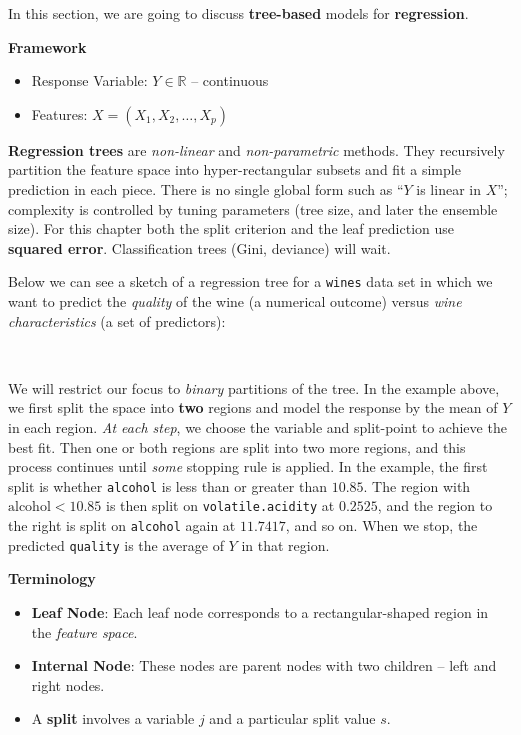 \documentclass[
]{book}
\providecommand{\tightlist}{%
  \setlength{\itemsep}{0pt}\setlength{\parskip}{0pt}}
\begin{document}
In this section, we are going to discuss \textbf{tree-based} models for \textbf{regression}.

\textbf{Framework}

\begin{itemize}
\tightlist
\item
  Response Variable: \(Y\in \mathbb{R}\) -- continuous ~
\item
  Features: \(X = (X_1, X_2, \ldots, X_p)\)~
\end{itemize}

\textbf{Regression trees} are \emph{non-linear} and \emph{non-parametric} methods. They recursively partition the feature space into hyper-rectangular subsets and fit a simple prediction in each piece. There is no single global form such as ``\(Y\) is linear in \(X\)''; complexity is controlled by tuning parameters (tree size, and later the ensemble size). For this chapter both the split criterion and the leaf prediction use \textbf{squared error}. Classification trees (Gini, deviance) will wait.

Below we can see a sketch of a regression tree for a \texttt{wines} data set in which we want to predict the \emph{quality} of the wine (a numerical outcome) versus \emph{wine characteristics} (a set of predictors):
~
~

~

We will restrict our focus to \emph{binary} partitions of the tree. In the example above, we first split the space into \textbf{two} regions and model the response by the mean of \(Y\) in each region. \emph{At each step}, we choose the variable and split-point to achieve the best fit. Then one or both regions are split into two more regions, and this process continues until \emph{some} stopping rule is applied. In the example, the first split is whether \texttt{alcohol} is less than or greater than \(10.85\). The region with \(\text{alcohol}<10.85\) is then split on \texttt{volatile.acidity} at \(0.2525\), and the region to the right is split on \texttt{alcohol} again at \(11.7417\), and so on. When we stop, the predicted \texttt{quality} is the average of \(Y\) in that region.
~

\textbf{Terminology}

\begin{itemize}
\tightlist
\item
  \textbf{Leaf Node}: Each leaf node corresponds to a rectangular-shaped region in the \emph{feature space}.
\item
  \textbf{Internal Node}: These nodes are parent nodes with two children -- left and right nodes.
\item
  A \textbf{split} involves a variable \(j\) and a particular split value \(s\).
\end{itemize}
\end{document}
